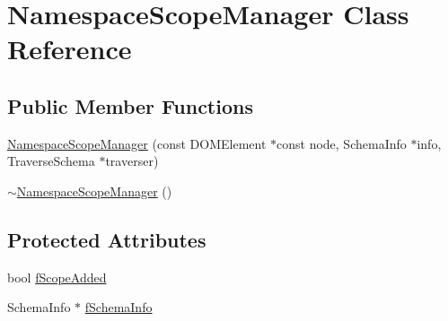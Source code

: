 \hypertarget{classNamespaceScopeManager}{\section{Namespace\-Scope\-Manager Class Reference}
\label{classNamespaceScopeManager}
}
\subsection*{Public Member Functions}
\begin{DoxyCompactItemize}
\item 
\hyperlink{classNamespaceScopeManager_a036266573c5d2b5d7f0aa66ff3cc839e}{Namespace\-Scope\-Manager} (const D\-O\-M\-Element $\ast$const node, Schema\-Info $\ast$info, Traverse\-Schema $\ast$traverser)
\item 
\hyperlink{classNamespaceScopeManager_ac45ca69c110e355c606eb38072a4be88}{$\sim$\-Namespace\-Scope\-Manager} ()
\end{DoxyCompactItemize}
\subsection*{Protected Attributes}
\begin{DoxyCompactItemize}
\item 
bool \hyperlink{classNamespaceScopeManager_ad5f2ddc43903c521c6f16b628a584875}{f\-Scope\-Added}
\item 
Schema\-Info $\ast$ \hyperlink{classNamespaceScopeManager_ab599ce75e5bc2513740a19de597662fc}{f\-Schema\-Info}
\end{DoxyCompactItemize}


